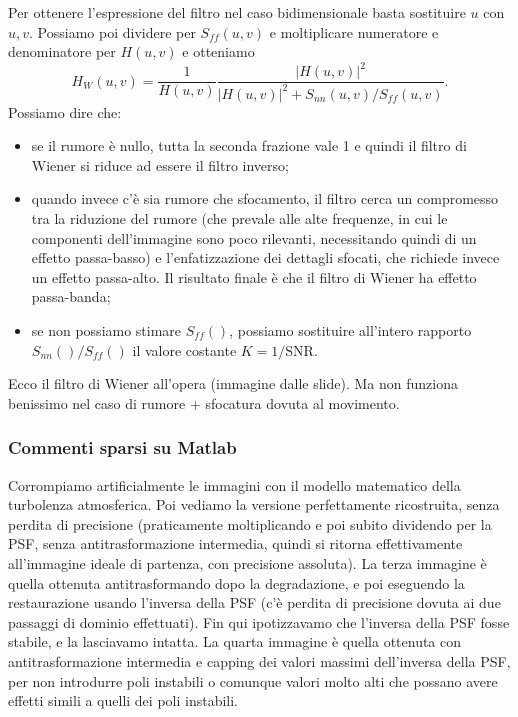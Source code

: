 \documentclass[a4paper,11pt]{article}
\begin{document}
\par
Per ottenere l'espressione del filtro nel caso bidimensionale basta sostituire $u$ con $u,v$. Possiamo poi dividere per $S_{ff}(u,v)$ e moltiplicare
numeratore e denominatore per $H(u,v)$ e otteniamo
\[
H_W(u,v) = \frac{1}{H(u,v)} \frac{|H(u,v)|^2}{|H(u,v)|^2+S_{nn}(u,v)/S_{ff}(u,v)}.
\]
Possiamo dire che:
\begin{itemize}
    \item se il rumore è nullo, tutta la seconda frazione vale 1 e quindi il filtro di Wiener si riduce ad essere il filtro inverso;
    \item quando invece c'è sia rumore che sfocamento, il filtro cerca un compromesso tra la riduzione del rumore (che prevale alle alte frequenze, in
    cui le componenti dell'immagine sono poco rilevanti, necessitando quindi di un effetto passa-basso) e l'enfatizzazione dei dettagli sfocati, che
    richiede invece un effetto passa-alto. Il risultato finale è che il filtro di Wiener ha effetto passa-banda;
    \item se non possiamo stimare $S_{ff}()$, possiamo sostituire all'intero rapporto $S_{nn}()/S_{ff}()$ il valore costante $K=1/$SNR.
\end{itemize}
\par
Ecco il filtro di Wiener all'opera (immagine dalle slide).
Ma non funziona benissimo nel caso di rumore + sfocatura dovuta al movimento.

\subsubsection{Commenti sparsi su Matlab}
Corrompiamo artificialmente le immagini con il modello matematico della turbolenza atmosferica.
Poi vediamo la versione perfettamente ricostruita, senza perdita di precisione (praticamente moltiplicando e poi subito dividendo per la PSF, senza
antitrasformazione intermedia, quindi si ritorna effettivamente all'immagine ideale di partenza, con precisione assoluta).
La terza immagine è quella ottenuta antitrasformando dopo la degradazione, e poi eseguendo la restaurazione usando l'inversa della PSF (c'è perdita
di precisione dovuta ai due passaggi di dominio effettuati).
Fin qui ipotizzavamo che l'inversa della PSF fosse stabile, e la lasciavamo intatta.
La quarta immagine è quella ottenuta con antitrasformazione intermedia e capping dei valori massimi dell'inversa della PSF, per non introdurre
poli instabili o comunque valori molto alti che possano avere effetti simili a quelli dei poli instabili.
\end{document}
